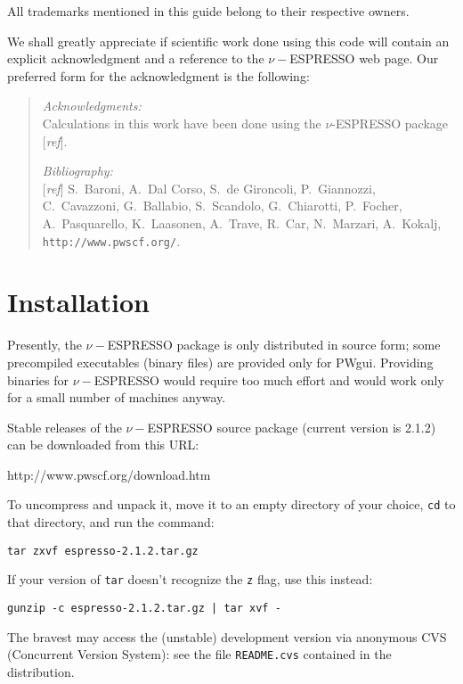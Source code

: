 \documentclass[12pt,a4paper]{article}
\def\stableversion{2.1.2} %
\begin{document}
All trademarks mentioned in this guide belong to their respective
owners.

We shall greatly appreciate if scientific work done using this code
will contain an explicit acknowledgment and a reference to the
$\nu-$ESPRESSO web page.
Our preferred form for the acknowledgment is the following:

\begin{quote}
\emph{Acknowledgments:}\\
Calculations in this work have been done using the $\nu$-ESPRESSO package
[\emph{ref}].
\par\noindent
\emph{Bibliography:}\\{}
[\emph{ref}]
S.~Baroni, A.~Dal Corso, S.~de Gironcoli, P.~Giannozzi, %
C.~Cavazzoni, G.~Ballabio, S.~Scandolo, G.~Chiarotti, P.~Focher, %
A.~Pasquarello, K.~Laasonen, A.~Trave, R.~Car, N.~Marzari, %
A.~Kokalj, %
\texttt{http://www.pwscf.org/}.
\end{quote}

\clearpage

\section{Installation}
  \label{installation}

Presently, the $\nu-$ESPRESSO package is only distributed in source
form; some precompiled executables (binary files) are provided only
for PWgui.
Providing binaries for $\nu-$ESPRESSO would require too much effort
and would work only for a small number of machines anyway.

Stable releases of the $\nu-$ESPRESSO source package (current version
is \stableversion) can be downloaded from this URL:
\medskip

%
                  {http://www.pwscf.org/download.htm}
\medskip

\noindent
To uncompress and unpack it, move it to an empty directory of your
choice, \texttt{cd} to that directory, and run the command:
\medskip

\texttt{tar zxvf espresso-\stableversion.tar.gz}
\medskip

\noindent
If your version of \texttt{tar} doesn't recognize the \texttt{z} flag,
use this instead:
\medskip

\texttt{gunzip -c espresso-\stableversion.tar.gz | tar xvf -}
\medskip

\noindent
The bravest may access the (unstable) development version via anonymous 
CVS (Concurrent Version System): see the file \texttt{README.cvs}
contained in the distribution.
\end{document}
